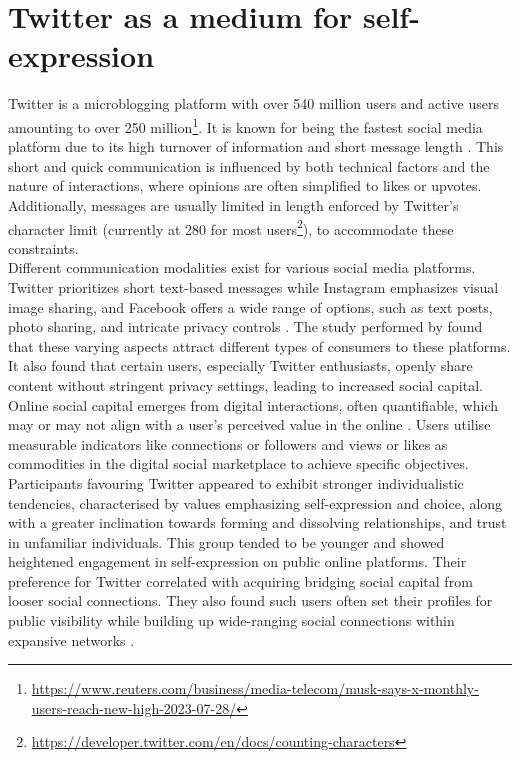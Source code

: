 \section{Twitter as a medium for self-expression}
Twitter is a microblogging platform with over 540 million users and active users amounting to over 250 million\footnote{\url{https://www.reuters.com/business/media-telecom/musk-says-x-monthly-users-reach-new-high-2023-07-28/}}. It is known for being the fastest social media platform due to its high turnover of information and short message length \cite{istanbulluogluComplaintHandlingSocial2017}. This short and quick communication is influenced by both technical factors and the nature of interactions, where opinions are often simplified to likes or upvotes. Additionally, messages are usually limited in length enforced by Twitter's character limit (currently at 280 for most users\footnote{\url{https://developer.twitter.com/en/docs/counting-characters}}), to accommodate these constraints. \\

Different communication modalities exist for various social media platforms. Twitter prioritizes short text-based messages while Instagram emphasizes visual image sharing, and Facebook offers a wide range of options, such as text posts, photo sharing, and intricate privacy controls \cite{shane-simpsonWhyCollegeStudents2018}. The study performed by \cite{shane-simpsonWhyCollegeStudents2018} found that these varying aspects attract different types of consumers to these platforms. It also found that certain users, especially Twitter enthusiasts, openly share content without stringent privacy settings, leading to increased social capital. Online social capital emerges from digital interactions, often quantifiable, which may or may not align with a user's perceived value in the online \cite{faucherSocialCapitalOnline2018}. Users utilise measurable indicators like connections or followers and views or likes as commodities in the digital social marketplace to achieve specific objectives. Participants favouring Twitter appeared to exhibit stronger individualistic tendencies, characterised by values emphasizing self-expression and choice, along with a greater inclination towards forming and dissolving relationships, and trust in unfamiliar individuals. This group tended to be younger and showed heightened engagement in self-expression on public online platforms. Their preference for Twitter correlated with acquiring bridging social capital from looser social connections. They also found such users often set their profiles for public visibility while building up wide-ranging social connections within expansive networks \cite{shane-simpsonWhyCollegeStudents2018}.\\

